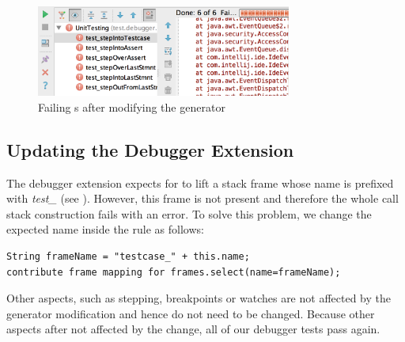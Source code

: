 \begin{figure}[h]
	\vspace{-2mm}
	\centering
    \includegraphics[width=8.4cm]{./figures/failingDebuggerTests.png} 
    \vspace{-3mm}
	\caption{Failing s after modifying the generator}
	\label{fig:TestExecution2}
	\vspace{-2mm}
\end{figure}

\subsection{Updating the Debugger Extension}

The debugger extension expects for  to lift a stack
frame whose name is prefixed with \emph{test\_} (see
). However, this frame is not present and therefore
the whole call stack construction fails with an error.
To solve this problem, we change the expected name inside the rule as
follows:
\begin{lstlisting}[language=debuggerDSL,frame=single]
String frameName = "testcase_" + this.name;
contribute frame mapping for frames.select(name=frameName);
\end{lstlisting}

Other aspects, such as stepping, breakpoints or watches are not affected by the
generator modification and hence do not need to be changed. Because other
aspects after not affected by the change, all of our debugger tests pass again.
